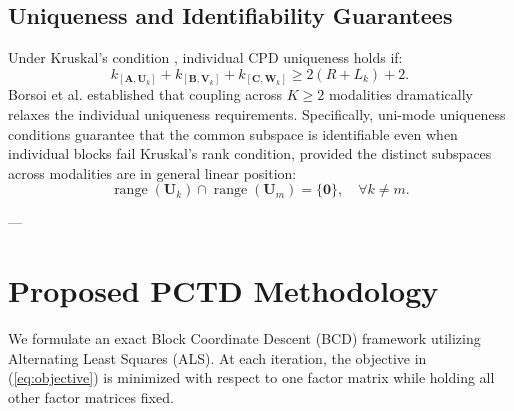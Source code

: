 \documentclass[11pt,a4paper]{article}
\begin{document}
\subsection{Uniqueness and Identifiability Guarantees}
Under Kruskal's condition \cite{kolda2009tensor}, individual CPD uniqueness holds if:
\begin{equation}
k_{[\mathbf{A}, \mathbf{U}_k]} + k_{[\mathbf{B}, \mathbf{V}_k]} + k_{[\mathbf{C}, \mathbf{W}_k]} \ge 2(R + L_k) + 2.
\end{equation}
Borsoi et al. \cite{borsoi2024pctd} established that coupling across $K \ge 2$ modalities dramatically relaxes the individual uniqueness requirements. Specifically, uni-mode uniqueness conditions guarantee that the common subspace is identifiable even when individual blocks fail Kruskal's rank condition, provided the distinct subspaces across modalities are in general linear position:
\begin{equation}
\operatorname{range}(\mathbf{U}_k) \cap \operatorname{range}(\mathbf{U}_m) = \{\mathbf{0}\}, \quad \forall k \ne m.
\end{equation}

---

\section{Proposed PCTD Methodology}
\label{sec:method}

We formulate an exact Block Coordinate Descent (BCD) framework utilizing Alternating Least Squares (ALS). At each iteration, the objective in (\ref{eq:objective}) is minimized with respect to one factor matrix while holding all other factor matrices fixed.
\end{document}
